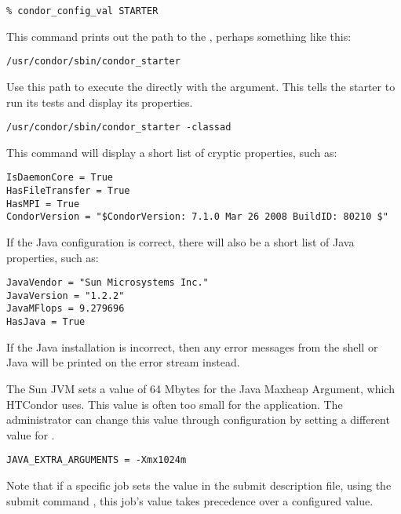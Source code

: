 \begin{verbatim}
% condor_config_val STARTER
\end{verbatim}

This command prints out the path to the ,
perhaps something like this:

\begin{verbatim}
/usr/condor/sbin/condor_starter
\end{verbatim}

Use this path to execute the  directly
with the  argument.
This tells the starter to run its tests and display its properties.

\begin{verbatim}
/usr/condor/sbin/condor_starter -classad
\end{verbatim}

This command will display a short list of cryptic properties, such as:

\begin{verbatim}
IsDaemonCore = True
HasFileTransfer = True
HasMPI = True
CondorVersion = "$CondorVersion: 7.1.0 Mar 26 2008 BuildID: 80210 $"
\end{verbatim}

If the Java configuration is correct, there will also
be a short list of Java properties, such as:

\begin{verbatim}
JavaVendor = "Sun Microsystems Inc."
JavaVersion = "1.2.2"
JavaMFlops = 9.279696
HasJava = True
\end{verbatim}

If the Java installation is incorrect, then any error
messages from the shell or Java will be printed
on the error stream instead.

The Sun JVM sets a value of 64 Mbytes for the Java Maxheap Argument,
which HTCondor uses.
This value is often too small for the application.
The administrator can change this value through configuration by setting
a different value for .

\footnotesize
\begin{verbatim}
JAVA_EXTRA_ARGUMENTS = -Xmx1024m
\end{verbatim}
\normalsize
Note that if a specific job sets the value in the submit description
file, using the submit command ,
this job's value takes precedence over a configured value.


